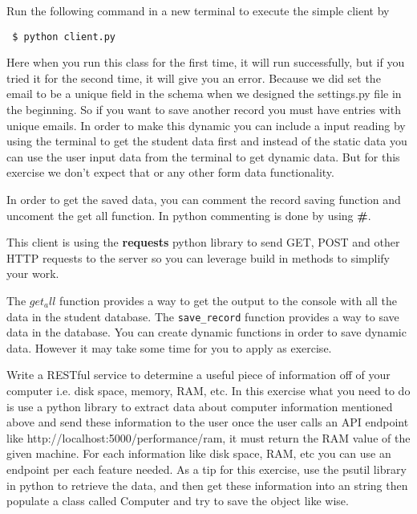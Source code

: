 Run the following command in a new terminal to execute the simple client by 

\begin{lstlisting}
 $ python client.py
\end{lstlisting}

Here when you run this class for the first time, it will run successfully, but 
if you tried it for the second time, it will give you an error. Because we did 
set the email to be a unique field in the schema when we designed the settings.py
file in the beginning. So if you want to save another record you must have entries
with unique emails. In order to make this dynamic you can include a input reading
by using the terminal to get the student data first and instead of the static
data you can use the user input data from the terminal to get dynamic data. 
But for this exercise we don't expect that or any other form data functionality.

In order to get the saved data, you can comment the record saving function and
uncoment the get all function. In python commenting is done by using \textbf{#}.

This client is using the \textbf{requests} python
library to send GET, POST and other HTTP requests to the server so you
can leverage build in methods to simplify your work.

The $get_all$ function provides a way to get the output to the
console with all the data in the student database. The \verb|save_record|
function provides a way to save data in the database. You can create
dynamic functions in order to save dynamic data. However it may take
some time for you to apply as exercise.

\begin{exercise}
Write a RESTful service to determine a useful piece of information off
of your computer i.e. disk space, memory, RAM, etc. In this exercise what
you need to do is use a python library to extract data about computer
information mentioned above and send these information to the user once
the user calls an API endpoint like http://localhost:5000/performance/ram,
it must return the RAM value of the given machine. For each information like
disk space, RAM, etc you can use an endpoint per each feature needed. As a tip 
for this exercise, use the psutil library in python to retrieve the data, and
then get these information into an string then populate a class called Computer 
and try to save the object like wise.
\end{exercise}

